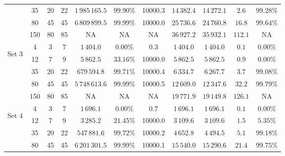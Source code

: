 \documentclass[../main.tex]{subfiles}
\begin{document}
\begin{table}
\begin{adjustbox}{width=0.95\columnwidth,center}
\begin{tabular}{|cccc|ccc|ccc|c|}
                        & 35      & 20    & 22    & $1\,985\,165.5$ & $99.90\%$     & 10000.3   & $14\,382.4$   & $14\,272.1$   & $2.6$     & $99.28\%$  \\
                        & 80      & 45    & 45    & $6\,809\,899.5$ & $99.99\%$     & 10000.0   & $25\,736.6$   & $24\,760.8$   & $16.8$    & $99.64\%$  \\
                        & 150     & 80    & 85    & NA              & NA            & NA        & $36\,927.2$   & $35\,932.1$   & $112.1$   & NA  \\
            \hline
                \multirow{5}{*}{\begin{sideways} Set 3 \end{sideways}}  
                        & 4       & 3     & 7     & $1\,404.0$      & $0.00\%$      & 0.3       & $1\,404.0$    & $1\,404.0$    & $0.1$     & $0.00\%$  \\
                        & 12      & 7     & 9     & $5\,862.5$      & $33.16\%$     & 10000.0   & $5\,862.5$    & $5\,862.5$    & $0.9$     & $0.00\%$  \\
                        & 35      & 20    & 22    & $679\,594.8$    & $99.71\%$     & 10000.4   & $6\,334.7$    & $6\,267.7$    & $3.7$     & $99.08\%$  \\
                        & 80      & 45    & 45    & $5\,748\,613.6$ & $99.99\%$     & 10000.5   & $12\,609.0$   & $12\,347.6$   & $32.2$    & $99.79\%$  \\
                        & 150     & 80    & 85    & NA              & NA            & NA        & $19\,771.9$   & $19\,149.8$   & $126.1$   & NA  \\
            \hline
                \multirow{5}{*}{\begin{sideways} Set 4 \end{sideways}}  
                        & 4       & 3     & 7     & $1\,696.1$      & $0.00\%$      & 0.7       & $1\,696.1$    & $1\,696.1$    & $0.1$     & $0.00\%$  \\
                        & 12      & 7     & 9     & $3\,285.2$      & $21.45\%$     & 10000.0   & $3\,109.6$    & $3\,109.6$    & $1.5$     & $5.35\%$  \\
                        & 35      & 20    & 22    & $547\,881.6$    & $99.72\%$     & 10000.2   & $4\,652.8$    & $4\,494.5$    & $5.1$     & $99.18\%$  \\
                        & 80      & 45    & 45    & $6\,201\,301.5$ & $99.99\%$     & 10000.1   & $15\,540.0$   & $15\,290.6$   & $21.4$    & $99.75\%$  \\

\end{tabular}
\end{adjustbox}
\end{table}
\end{document}
